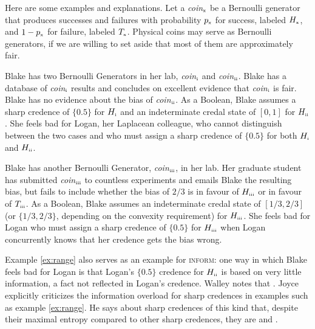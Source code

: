 \documentclass[12pt]{article}
\begin{document}
Here are some examples and explanations. Let a
\textit{coin}$_{\mbox{\tiny{x}}}$ be a Bernoulli generator that
produces successes and failures with probability $p_{\mbox{\tiny{x}}}$
for success, labeled $H_{\mbox{\tiny{x}}}$, and
$1-p_{\mbox{\tiny{x}}}$ for failure, labeled $T_{\mbox{\tiny{x}}}$.
Physical coins may serve as Bernoulli generators, if we are willing to
set aside that most of them are approximately fair.

\begin{quotex}
  \label{ex:range} Blake has two Bernoulli Generators in
  her lab, \textit{coin}$_{\mbox{\tiny{i}}}$ and
  \textit{coin}$_{\mbox{\tiny{ii}}}$. Blake has a database of
  \textit{coin}$_{\mbox{\tiny{i}}}$ results and concludes on excellent
  evidence that \textit{coin}$_{\mbox{\tiny{i}}}$ is fair. Blake has no
  evidence about the bias of \textit{coin}$_{\mbox{\tiny{ii}}}$. As a
  Boolean, Blake assumes a sharp credence of $\{0.5\}$ for
  $H_{\mbox{\tiny{i}}}$ and an indeterminate credal state of $[0,1]$
  for $H_{\mbox{\tiny{ii}}}$. She feels bad for Logan, her Laplacean
  colleague, who cannot distinguish between the two cases and who must
  assign a sharp credence of $\{0.5\}$ for both $H_{\mbox{\tiny{i}}}$
  and $H_{\mbox{\tiny{ii}}}$.
\end{quotex}

\begin{quotex}
  \label{ex:incomp} Blake has another Bernoulli
  Generator, \textit{coin}$_{\mbox{\tiny{iii}}}$, in her lab. Her
  graduate student has submitted \textit{coin}$_{\mbox{\tiny{iii}}}$
  to countless experiments and emails Blake the resulting bias, but
  fails to include whether the bias of $2/3$ is in favour of
  $H_{\mbox{\tiny{iii}}}$ or in favour of $T_{\mbox{\tiny{iii}}}$. As
  a Boolean, Blake assumes an indeterminate credal state of
  $[1/3,2/3]$ (or $\{1/3,2/3\}$, depending on the convexity
  requirement) for $H_{\mbox{\tiny{iii}}}$. She feels bad for Logan
  who must assign a sharp credence of $\{0.5\}$ for
  $H_{\mbox{\tiny{iii}}}$ when Logan concurrently knows that her
  credence gets the bias wrong.
\end{quotex}

Example \ref{ex:range} also serves as an example for \textsc{inform}:
one way in which Blake feels bad for Logan is that Logan's $\{0.5\}$
credence for $H_{\mbox{\tiny{ii}}}$ is based on very little
information, a fact not reflected in Logan's credence. Walley notes
that 
. Joyce explicitly criticizes the information
overload for sharp credences in examples such as example
\ref{ex:range}. He says about sharp credences of this kind that,
despite their maximal entropy compared to other sharp credences, they
are  and  .
\end{document}
